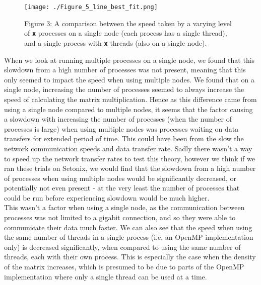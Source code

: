 \documentclass[11pt,leqno]{article}
\begin{document}
\begin{flushleft}



\begin{figure}[h!t]
\centering
\texttt{[image: ./Figure\_5\_line\_best\_fit.png]}
\caption{Figure 3: A comparison between the speed taken by a varying level of \textbf{\texttt{x}} processes on a single node (each process has a single thread), and a single process with \textbf{\texttt{x}} threads (also on a single node).}
\end{figure}


When we look at running multiple processes on a single node, we found that this slowdown from a high number of processes was not present, meaning that this only seemed to impact the speed when using multiple nodes. We found that on a single node, increasing the number of processes seemed to always increase the speed of calculating the matrix multiplication. Hence as this difference came from using a single node compared to multiple nodes, it seems that the factor causing a slowdown with increasing the number of processes (when the number of processes is large) when using multiple nodes was processes waiting on data transfers for extended period of time. This could have been from the slow the network communication speeds and data transfer rate. Sadly there wasn't a way to speed up the network transfer rates to test this theory, however we think if we ran these trials on Setonix, we would find that the slowdown from a high number of  processes when using multiple nodes would be significantly decreased, or potentially not even present - at the very least the number of processes that could be run before  experiencing slowdown would be much higher. \\[2 ex]


This wasn't a factor when using a single node, as the communication between processes was not limited to a gigabit connection, and so they were able to communicate their data much faster. We can also see that the speed when using the same number of threads in a single process (i.e. an OpenMP implementation only) is decreased significantly, when compared to using the same number of threads, each with their own process. This is especially the case when the density of the matrix increases, which is presumed to be due to parts of the OpenMP implementation where only a single thread can be used at a time.  \\[2 ex]


\end{flushleft}
\end{document}
